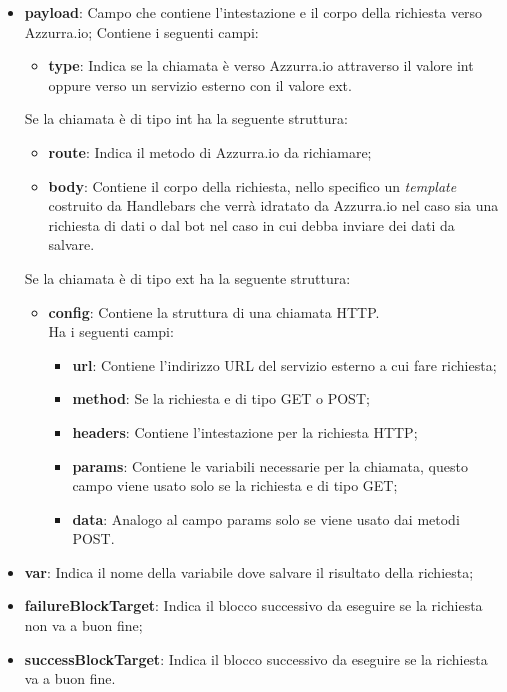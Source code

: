 \begin{itemize}
	\item \textbf{payload}: Campo che contiene l'intestazione e il corpo della richiesta verso Azzurra.io;
	Contiene i seguenti campi:
	\begin{itemize}
		\item \textbf{type}: Indica se la chiamata è verso Azzurra.io attraverso il valore \textsf{int} oppure verso un servizio esterno con il valore \textsf{ext}.
	\end{itemize}
	Se la chiamata è di tipo int ha la seguente struttura:
	\begin{itemize}
		\item \textbf{route}: Indica il metodo di Azzurra.io da richiamare;
		\item \textbf{body}: Contiene il corpo della richiesta, nello specifico un \emph{template} costruito da Handlebars che verrà idratato da Azzurra.io nel caso sia una richiesta di dati o dal bot nel caso in cui debba inviare dei dati da salvare.
	\end{itemize}
	Se la chiamata è di tipo ext ha la seguente struttura:
	\begin{itemize}
		\item \textbf{config}: Contiene la struttura di una chiamata HTTP.\\
		Ha i seguenti campi:
		\begin{itemize}
			\item \textbf{url}: Contiene l'indirizzo URL del servizio esterno a cui fare richiesta;
			\item \textbf{method}: Se la richiesta e di tipo GET o POST;
			\item \textbf{headers}: Contiene l'intestazione per la richiesta HTTP;
			\item \textbf{params}: Contiene le variabili necessarie per la chiamata, questo campo viene usato solo se la richiesta e di tipo GET;
			\item \textbf{data}: Analogo al campo params solo se viene usato dai metodi POST.
		\end{itemize}
	\end{itemize}
	\item \textbf{var}: Indica il nome della variabile dove salvare il risultato della richiesta;
	\item \textbf{failureBlockTarget}: Indica il blocco successivo da eseguire se la richiesta non va a buon fine;
	\item \textbf{successBlockTarget}: Indica il blocco successivo da eseguire se la richiesta va a buon fine.
\end{itemize}

